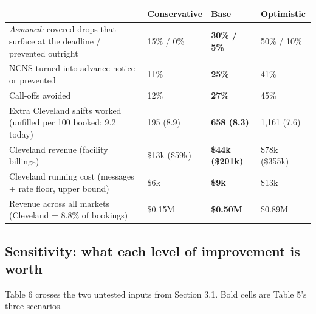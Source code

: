 \documentclass[11pt]{article}
\begin{document}
\begin{center}\small
{}
\begin{tabularx}{\textwidth}{@{}LR{2.2cm}R{2.4cm}R{2.2cm}@{}}
\toprule
 & Conservative & \textbf{Base} & Optimistic \\
\midrule
\textit{Assumed:} covered drops that surface at the deadline / prevented outright & 15\% / 0\% & \textbf{30\% / 5\%} &
50\% / 10\% \\
NCNS turned into advance notice or prevented & 11\% & \textbf{25\%} & 41\% \\
Call-offs avoided & 12\% & \textbf{27\%} & 45\% \\
Extra Cleveland shifts worked (unfilled per 100 booked; 9.2 today) & 195 (8.9) & \textbf{658 (8.3)} & 1,161 (7.6) \\
Cleveland revenue (facility billings) & \$13k (\$59k) & \textbf{\$44k (\$201k)} & \$78k (\$355k) \\
Cleveland running cost (messages + rate floor, upper bound) & \$6k & \textbf{\$9k} & \$13k \\
Revenue across all markets (Cleveland = 8.8\% of bookings) & \$0.15M & \textbf{\$0.50M} & \$0.89M \\
\bottomrule
\end{tabularx}
\end{center}

\subsection{Sensitivity: what each level of improvement is worth}

Table 6 crosses the two untested inputs from Section 3.1. Bold cells are Table 5's three scenarios.
\end{document}
